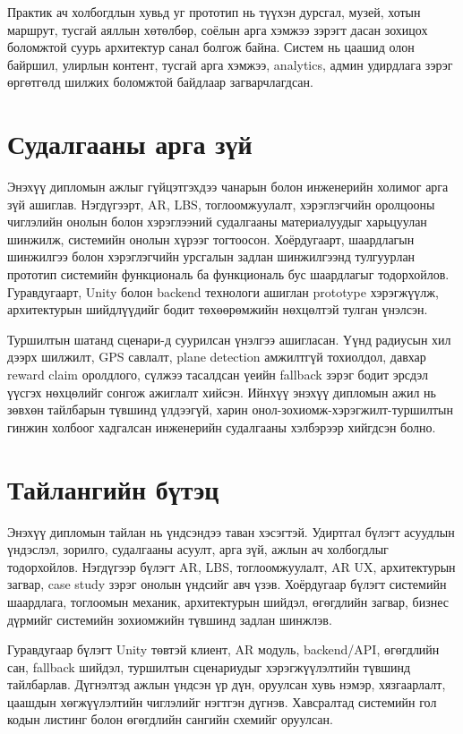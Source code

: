 \begin{sloppy}
Практик ач холбогдлын хувьд уг прототип нь түүхэн дурсгал, музей, хотын маршрут, тусгай аяллын хөтөлбөр, соёлын арга хэмжээ зэрэгт дасан зохицох боломжтой суурь архитектур санал болгож байна. Систем нь цаашид олон байршил, улирлын контент, тусгай арга хэмжээ, analytics, админ удирдлага зэрэг өргөтгөлд шилжих боломжтой байдлаар загварчлагдсан.

\section{Судалгааны арга зүй}

Энэхүү дипломын ажлыг гүйцэтгэхдээ чанарын болон инженерийн холимог арга зүй ашиглав. Нэгдүгээрт, AR, LBS, тоглоомжуулалт, хэрэглэгчийн оролцооны чиглэлийн онолын болон хэрэглээний судалгааны материалуудыг харьцуулан шинжилж, системийн онолын хүрээг тогтоосон. Хоёрдугаарт, шаардлагын шинжилгээ болон хэрэглэгчийн урсгалын задлан шинжилгээнд тулгуурлан прототип системийн функциональ ба функциональ бус шаардлагыг тодорхойлов. Гуравдугаарт, Unity болон backend технологи ашиглан prototype хэрэгжүүлж, архитектурын шийдлүүдийг бодит төхөөрөмжийн нөхцөлтэй тулган үнэлсэн.

Туршилтын шатанд сценари-д суурилсан үнэлгээ ашигласан. Үүнд радиусын хил дээрх шилжилт, GPS савлалт, plane detection амжилтгүй тохиолдол, давхар reward claim оролдлого, сүлжээ тасалдсан үеийн fallback зэрэг бодит эрсдэл үүсгэх нөхцөлийг сонгож ажиглалт хийсэн. Ийнхүү энэхүү дипломын ажил нь зөвхөн тайлбарын түвшинд үлдээгүй, харин онол-зохиомж-хэрэгжилт-туршилтын гинжин холбоог хадгалсан инженерийн судалгааны хэлбэрээр хийгдсэн болно.

\section{Тайлангийн бүтэц}

Энэхүү дипломын тайлан нь үндсэндээ таван хэсэгтэй. Удиртгал бүлэгт асуудлын үндэслэл, зорилго, судалгааны асуулт, арга зүй, ажлын ач холбогдлыг тодорхойлов. Нэгдүгээр бүлэгт AR, LBS, тоглоомжуулалт, AR UX, архитектурын загвар, case study зэрэг онолын үндсийг авч үзэв. Хоёрдугаар бүлэгт системийн шаардлага, тоглоомын механик, архитектурын шийдэл, өгөгдлийн загвар, бизнес дүрмийг системийн зохиомжийн түвшинд задлан шинжлэв.

Гуравдугаар бүлэгт Unity төвтэй клиент, AR модуль, backend/API, өгөгдлийн сан, fallback шийдэл, туршилтын сценариудыг хэрэгжүүлэлтийн түвшинд тайлбарлав. Дүгнэлтэд ажлын үндсэн үр дүн, оруулсан хувь нэмэр, хязгаарлалт, цаашдын хөгжүүлэлтийн чиглэлийг нэгтгэн дүгнэв. Хавсралтад системийн гол кодын листинг болон өгөгдлийн сангийн схемийг оруулсан.

\end{sloppy}

